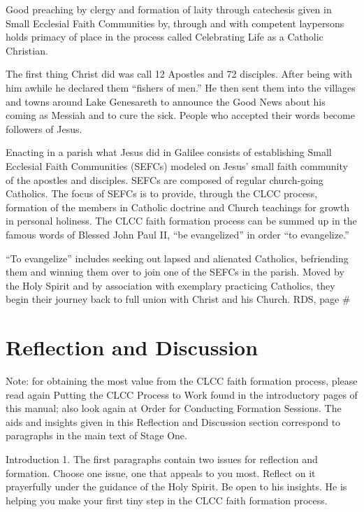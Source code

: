 \documentclass[oneside]{book}
\begin{document}
Good preaching by clergy and formation of laity through catechesis given in
Small Ecclesial Faith Communities by, through and with competent laypersons
holds primacy of place in the process called Celebrating Life as a Catholic
Christian.

The first thing Christ did was call 12 Apostles and 72 disciples. After being
with him awhile he declared them ``fishers of men.'' He then sent them into the
villages and towns around Lake Genesareth  to announce the Good News about his
coming as Messiah and to cure the sick. People who accepted their words become
followers of Jesus.

Enacting in a parish what Jesus did in Galilee consists of establishing Small
Ecclesial Faith Communities (SEFCs) modeled on Jesus' small faith community of
the apostles and disciples. SEFCs are composed of regular church-going
Catholics. The focus of SEFCs is to provide, through the CLCC process, formation
of the members in Catholic doctrine and Church teachings for growth in personal
holiness. The CLCC faith formation process can be summed up in the famous words
of Blessed John Paul II, ``be evangelized'' in order ``to evangelize.''

``To evangelize'' includes seeking out lapsed and alienated Catholics,
befriending them and winning them over to join one of the SEFCs in the
parish. Moved by the Holy Spirit and by association with exemplary practicing
Catholics, they begin their journey back to full union with Christ and his
Church.
RDS, page \#


\section{Reflection and Discussion}

Note: for obtaining the most value from the CLCC faith formation process, please
read again Putting the CLCC Process to Work found in the introductory pages of
this manual; also look again at Order for Conducting Formation Sessions.  The
aids and insights given in this Reflection and Discussion section correspond to
paragraphs in the main text of Stage One.


Introduction 1. The first paragraphs contain two issues for reflection and
formation. Choose one issue, one that appeals to you most. Reflect on it
prayerfully under the guidance of the Holy Spirit. Be open to his insights. He
is helping you make your first tiny step in the CLCC faith formation process.
\end{document}
